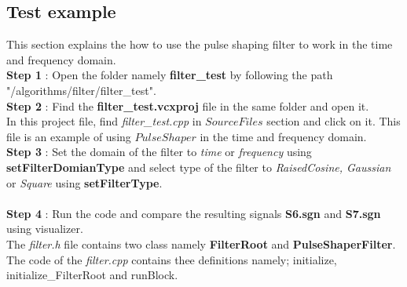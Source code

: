 \subsection*{Test example}
This section explains the how to use the pulse shaping filter to work in the time and frequency domain.\\
\textbf{Step 1} : Open the folder namely \textbf{filter\_test} by following the path  "/algorithms/filter/filter\_test".\\ 
\textbf{Step 2} : Find the \textbf{filter\_test.vcxproj} file in the same folder and open it.\\
In this project file, find \textit{filter\_test.cpp} in $Source Files$ section and click on it. This file is an example of using $PulseShaper$ in the time and frequency domain.\\

\textbf{Step 3} : Set the domain of the filter to \textit{time} or \textit{frequency} using \textbf{setFilterDomianType} and select type of the filter to \textit{ RaisedCosine, Gaussian} or \textit{Square} using \textbf{setFilterType}.\\ \\
\textbf{Step 4} : Run the code and compare the resulting signals \textbf{S6.sgn} and \textbf{S7.sgn} using visualizer.\\
The \textit{filter.h} file contains two class namely \textbf{FilterRoot} and \textbf{PulseShaperFilter}.\\

The code of the \textit{filter.cpp} contains thee definitions namely; initialize, initialize\_FilterRoot and runBlock.

\newpage
